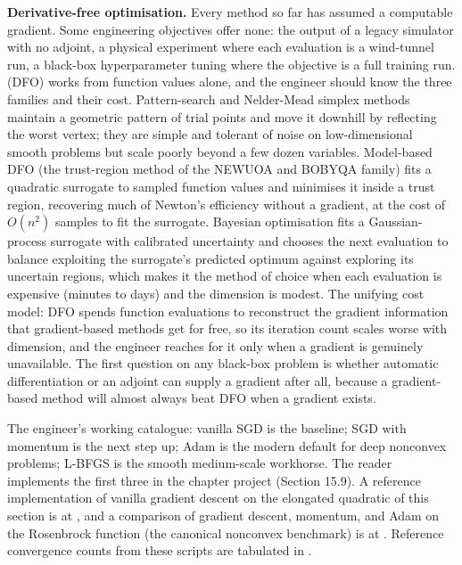 \begin{mastery}
\textbf{Derivative-free optimisation.} Every method so far has assumed
a computable gradient. Some engineering objectives offer none: the
output of a legacy simulator with no adjoint, a physical experiment
where each evaluation is a wind-tunnel run, a black-box hyperparameter
tuning where the objective is a full training run.  (DFO) works from function values alone, and the
engineer should know the three families and their cost. Pattern-search
and Nelder-Mead simplex methods maintain a geometric pattern of trial
points and move it downhill by reflecting the worst vertex; they are
simple and tolerant of noise on low-dimensional smooth problems but scale poorly
beyond a few dozen variables. Model-based DFO (the trust-region method
of the NEWUOA and BOBYQA family) fits a quadratic surrogate to sampled
function values and minimises it inside a trust region, recovering much
of Newton's efficiency without a gradient, at the cost of $O(n^{2})$
samples to fit the surrogate. Bayesian optimisation fits a Gaussian-
process surrogate with calibrated uncertainty and chooses the next
evaluation to balance exploiting the surrogate's predicted optimum
against exploring its uncertain regions, which makes it the method of
choice when each evaluation is expensive (minutes to days) and the
dimension is modest. The unifying cost model: DFO spends function
evaluations to reconstruct the gradient information that gradient-based
methods get for free, so its iteration count scales worse with
dimension, and the engineer reaches for it only when a gradient is
genuinely unavailable. The first question on any black-box problem is
whether automatic differentiation or an adjoint can supply a gradient
after all, because a gradient-based method will almost always beat DFO
when a gradient exists.
\end{mastery}

The engineer's working catalogue: vanilla SGD is the baseline;
SGD with momentum is the next step up; Adam is the modern
default for deep nonconvex problems; L-BFGS is the smooth
medium-scale workhorse. The reader implements the first three in
the chapter project (Section 15.9). A reference implementation of
vanilla gradient descent on the elongated quadratic of this
section is at
,
and a comparison of gradient descent, momentum, and Adam on the
Rosenbrock function (the canonical nonconvex benchmark) is at
.
Reference convergence counts from these scripts are tabulated in
.

